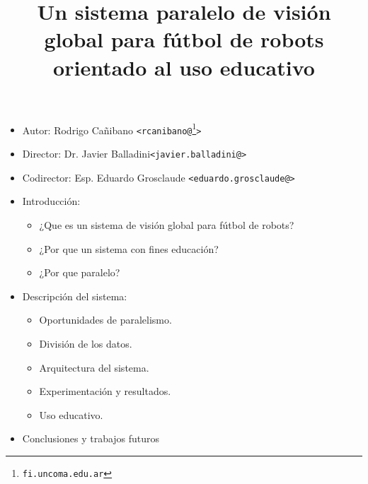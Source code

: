 \documentclass[11pt,a4paper,spanish]{beamer}
\title{Un sistema paralelo de visión global para fútbol de robots
	orientado al uso educativo}
\author{}
\date{}
\begin{document}
\begin{frame}

	\maketitle

\begin{itemize}

	\small

	\item Autor: Rodrigo Cañibano \texttt{<rcanibano@\footnote[1]{fi.uncoma.edu.ar}>}

	\item Director: Dr. Javier Balladini\texttt{<javier.balladini@\footnotemark[1]>}

	\item Codirector: Esp. Eduardo Grosclaude \texttt{<eduardo.grosclaude@\footnotemark[1]>}

\end{itemize}

\end{frame}

\begin{frame}

\begin{itemize}

\item Introducción:

\begin{itemize}

	\item ¿Que es un sistema de visión global para fútbol de robots?

	\item ¿Por que un sistema con fines educación?

	\item ¿Por que paralelo?

\end{itemize}

\item Descripción del sistema:

\begin{itemize}

	\item Oportunidades de paralelismo.

	\item División de los datos.

	\item Arquitectura del sistema.

	\item Experimentación y resultados.

	\item Uso educativo.

\end{itemize}

\item Conclusiones y trabajos futuros

\end{itemize}

\end{frame}
\end{document}
